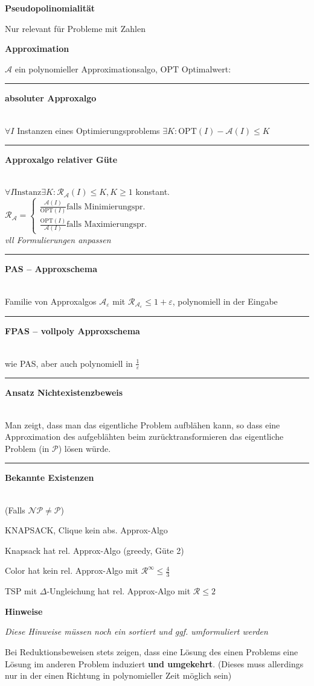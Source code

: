 \documentclass{article}
\newcommand{\h}[1]{\vspace{1ex}\begin{center}\small\textbf{#1}\end{center}}
\newcommand{\hh}[1]{{\vspace{1pt}\hrule\vspace{1pt} \noindent\textbf{#1}}\\}
\newenvironment{tightlist}{
\begin{list}{\textbullet}{
\setlength{\topsep}{-1ex}
\setlength{\itemsep}{-1ex}
\setlength{\leftmargin}{4ex}
}
}{
\end{list}
\vspace{1ex}
}
\newcommand{\FM}[1]{{\color{red}\emph{#1}}}
\begin{document}
\begin{multicols}{4}
\h{Pseudopolinomialität}
Nur relevant für Probleme mit Zahlen
\h{Approximation}
$\mathcal{A}$ ein polynomieller Approximationsalgo, $\text{OPT}$ Optimalwert:\\
\hh{absoluter Approxalgo} $\forall I$ Instanzen eines Optimierungsproblems $\exists K: \text{OPT}(I) - \mathcal{A}(I) \le K$\\
\hh{Approxalgo relativer Güte} $\forall I\text{Instanz}\exists K: \mathcal{R}_{\mathcal{A}}(I)\le K, K\ge 1$ konstant.\\
$\mathcal{R}_{\mathcal{A}}=\begin{cases}\frac{\mathcal{A}(I)}{\text{OPT}(I)}\text{falls Minimierungspr.}\\ \frac{\text{OPT}(I)}{\mathcal{A}(I)}\text{falls Maximierungspr.}\end{cases}$\\
\FM{vll Formulierungen anpassen}\\
\hh{PAS -- Approxschema} Familie von Approxalgos $\mathcal{A}_{\varepsilon}$ mit $\mathcal{R}_{\mathcal{A}_{\varepsilon}}\le 1+\varepsilon$, polynomiell in der Eingabe\\
\hh{FPAS -- vollpoly Approxschema} wie PAS, aber auch polynomiell in $\frac{1}{\varepsilon}$\\

\hh{Ansatz Nichtexistenzbeweis} Man zeigt, dass man das eigentliche Problem aufblähen kann, so dass eine Approximation des aufgeblähten beim zurücktransformieren das eigentliche Problem (in $\mathcal{P}$) lösen würde.

\hh{Bekannte Existenzen}
(Falls $\mathcal{NP}\ne\mathcal{P}$)
\begin{tightlist}
\item KNAPSACK, Clique kein abs. Approx-Algo
\item Knapsack hat rel. Approx-Algo (greedy, Güte 2)
\item Color hat kein rel. Approx-Algo mit $\mathcal{R}^\infty \le \frac43$
\item TSP mit $\Delta$-Ungleichung hat rel. Approx-Algo mit $\mathcal{R}\le 2$
\end{tightlist}

\h{Hinweise}
\FM{Diese Hinweise müssen noch ein sortiert und ggf. umformuliert werden}

\begin{tightlist}
\item Bei Reduktionsbeweisen stets zeigen, dass eine Lösung des einen Problems eine Lösung im anderen Problem induziert \textbf{und umgekehrt}. (Dieses muss allerdings nur in der einen Richtung in polynomieller Zeit möglich sein)
\end{tightlist}

\end{multicols}
\end{document}
